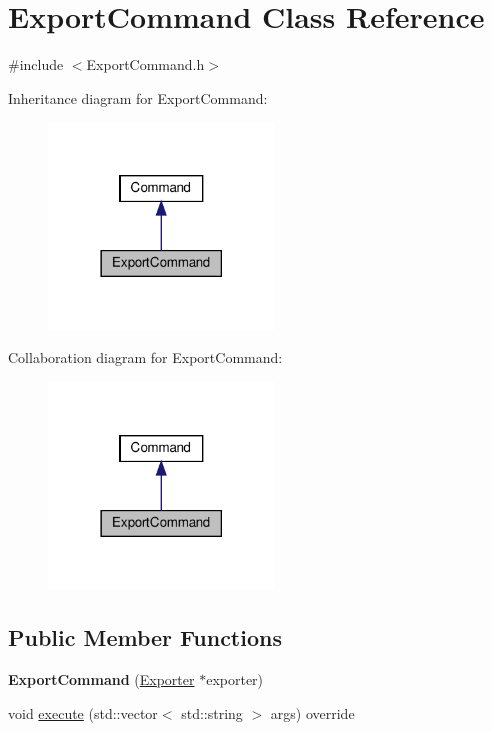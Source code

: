 \hypertarget{classExportCommand}{}\section{Export\+Command Class Reference}
\label{classExportCommand}


{\ttfamily \#include $<$Export\+Command.\+h$>$}



Inheritance diagram for Export\+Command\+:
\nopagebreak
\begin{figure}[H]
\begin{center}
\leavevmode
\includegraphics[width=170pt]{d1/d67/classExportCommand__inherit__graph}
\end{center}
\end{figure}


Collaboration diagram for Export\+Command\+:
\nopagebreak
\begin{figure}[H]
\begin{center}
\leavevmode
\includegraphics[width=170pt]{d8/db5/classExportCommand__coll__graph}
\end{center}
\end{figure}
\subsection*{Public Member Functions}
\begin{DoxyCompactItemize}
\item 
\mbox{\label{classExportCommand_a28a0d2e9fd33e7b78ccfa716d03c7d2f}} 
{\bfseries Export\+Command} (\hyperlink{classExporter}{Exporter} $\ast$exporter)
\item 
void \hyperlink{classExportCommand_ac06d7e8b8114b543efd03879f9825a7c}{execute} (std\+::vector$<$ std\+::string $>$ args) override
\end{DoxyCompactItemize}


